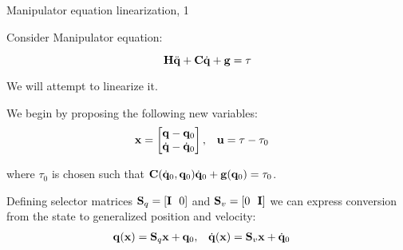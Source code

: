 \documentclass{beamer}
\begin{document}
\begin{frame}{Manipulator equation linearization, 1}
\begin{flushleft}

Consider Manipulator equation:

\begin{equation}
	\mathbf{H} \ddot{\mathbf{q}} + \mathbf{C} \dot{\mathbf{q}} + \mathbf{g} = \tau
\end{equation}

We will attempt to linearize it.

\bigskip

We begin by proposing the following new variables:
%
\begin{align}
	\mathbf{x} = 
	\begin{bmatrix}
		\mathbf{q} - \mathbf{q}_0 \\ 
		\dot{\mathbf{q}} - \dot{\mathbf{q}}_0
	\end{bmatrix},&  
\ \ \
	\mathbf{u} = \tau - \tau_0
\end{align}

where $\tau_0$ is chosen such that $\mathbf{C}(\dot{\mathbf{q}}_0, \mathbf{q}_0) \dot{\mathbf{q}}_0 + \mathbf{g}(\mathbf{q}_0) = \tau_0$.

\bigskip

Defining selector matrices $\mathbf{S}_q = [ \mathbf{I} \ \ 0 ]$ and $\bo{S}_v = [ 0  \ \ \bo{I} ]$ we can express conversion from the state to generalized position and velocity:
%
\begin{align}
	\mathbf{q}(\mathbf{x}) = \mathbf{S}_q \mathbf{x} + \mathbf{q}_0, &  
	\ \ \
	\dot{\mathbf{q}}(\mathbf{x}) = \mathbf{S}_v \mathbf{x} + \dot{\mathbf{q}}_0
\end{align}


\end{flushleft}
\end{frame}
\end{document}
